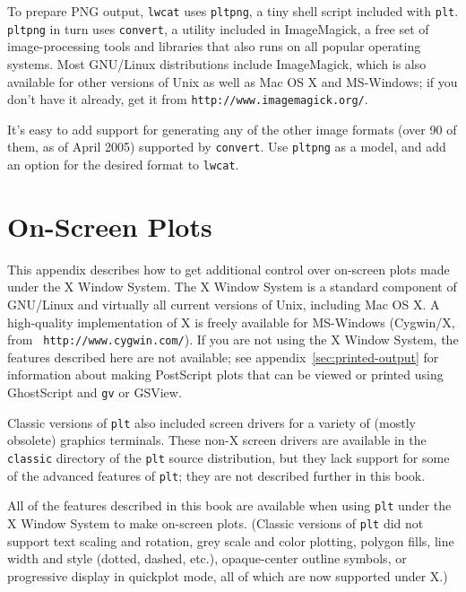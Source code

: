 \documentclass{book}
\begin{document}
%
%
%
%
%
%
%
To prepare PNG output, {\tt lwcat} uses {\tt pltpng}, a tiny
shell script included with {\tt plt}.  {\tt pltpng} in turn uses
{\tt convert}, a utility included in ImageMagick, a free set of
image-processing tools and libraries that also runs on all popular
operating systems.  Most GNU/Linux distributions include ImageMagick,
which is also available for other versions of Unix as well as Mac OS X
and MS-Windows;  if you don't have it already, get it from
{\tt http://www.imagemagick.org/}.

It's easy to add support for generating any of the other image formats
(over 90 of them, as of April 2005) supported by {\tt convert}.  Use
{\tt pltpng} as a model, and add an option for the desired format to
{\tt lwcat}.

\chapter{On-Screen Plots \label{sec:screen-output}}

%
%
%
%
%
%
%
This appendix describes how to get additional control over on-screen
plots made under the X Window System.  The X Window System is a
standard component of GNU/Linux and virtually all current versions of
Unix, including Mac OS X.  A high-quality implementation of X is
freely available for MS-Windows (Cygwin/X, from {\tt
http://www.\-cygwin.com/}).  If you are not using the X Window System,
the features described here are not available; see
appendix~\ref{sec:printed-output} for information about making
PostScript plots that can be viewed or printed using GhostScript and
{\tt gv} or GSView.

Classic versions of {\tt plt} also included screen drivers for a
variety of (mostly obsolete) graphics terminals.  These non-X screen
drivers are available in the {\tt classic} directory of the {\tt plt}
source distribution, but they lack support for some of the advanced
features of {\tt plt}; they are not described further in this book.

%
%
%
%
%
All of the features described in this book are available when using
{\tt plt} under the X Window System to make on-screen plots.  (Classic
versions of {\tt plt} did not support text scaling and rotation, grey
scale and color plotting, polygon fills, line width and style (dotted,
dashed, etc.), opaque-center outline symbols, or progressive display
in quickplot mode, all of which are now supported under X.)
\end{document}
